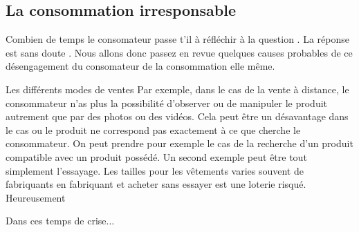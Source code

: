\subsection{La consommation irresponsable}

Combien de temps le consomateur passe t'il à réfléchir à la question .
La réponse est sans doute . Nous allons donc passez en revue quelques causes probables de ce désengagement du consomateur de la consommation elle même.

\medbreak
Les différents modes de ventes 
Par exemple, dans le cas de la vente à distance, le consommateur n'as plus la possibilité d'observer ou de manipuler le produit autrement que par des photos ou des vidéos.
Cela peut être un désavantage dans le cas ou le produit ne correspond pas exactement à ce que cherche le consommateur.
\smallbreak
On peut prendre pour exemple le cas de la recherche d'un produit compatible avec un produit possédé.
Un second exemple peut être tout simplement l'essayage. Les tailles pour les vêtements varies souvent de fabriquants en fabriquant et acheter sans essayer est une loterie risqué.
\smallbreak
 Heureusement %

\medbreak
Dans ces temps de crise... %

